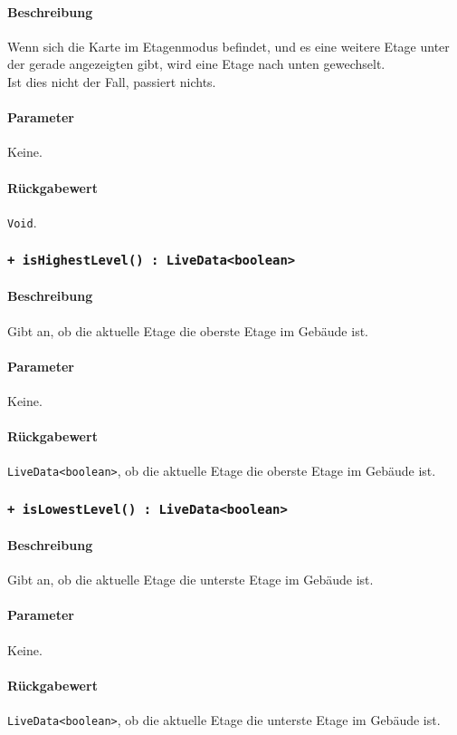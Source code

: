 \paragraph*{Beschreibung}
Wenn sich die Karte im Etagenmodus befindet, und es eine weitere Etage unter der gerade 
angezeigten gibt, wird eine Etage nach unten gewechselt.\\
Ist dies nicht der Fall, passiert nichts.
\paragraph*{Parameter}
Keine.
\paragraph*{Rückgabewert}
\texttt{Void}.

\subsubsection*{\texttt{+ isHighestLevel() : LiveData<boolean>}}%
\paragraph*{Beschreibung}
Gibt an, ob die aktuelle Etage die oberste Etage im Gebäude ist.
\paragraph*{Parameter}
Keine.
\paragraph*{Rückgabewert}
\texttt{LiveData<boolean>}, ob die aktuelle Etage die oberste Etage im Gebäude ist.

\subsubsection*{\texttt{+ isLowestLevel() : LiveData<boolean>}}%
\paragraph*{Beschreibung}
Gibt an, ob die aktuelle Etage die unterste Etage im Gebäude ist.
\paragraph*{Parameter}
Keine.
\paragraph*{Rückgabewert}
\texttt{LiveData<boolean>}, ob die aktuelle Etage die unterste Etage im Gebäude ist.

